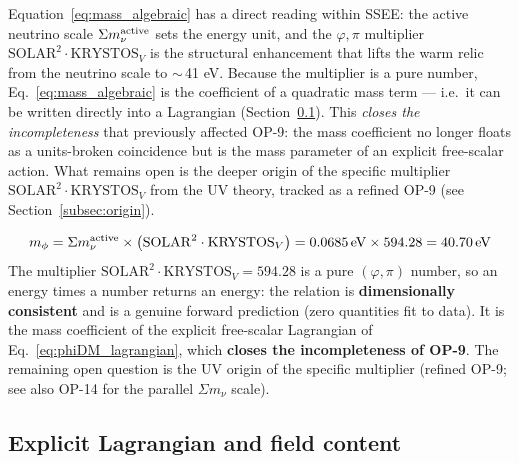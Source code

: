 \documentclass[12pt,a4paper]{article}
\newcommand{\SSEE}{\textsc{SSEE}}
\newcommand{\mphi}{m_\phi}
\newcommand{\mnu}{\Sigma m_\nu}
\begin{document}
Equation~\eqref{eq:mass_algebraic} has a direct reading within \SSEE: the active
neutrino scale $\mnu^{\rm active}$ sets the energy unit, and the $\varphi,\pi$
multiplier $\mathrm{SOLAR}^2\cdot\mathrm{KRYSTOS}_V$ is the structural enhancement
that lifts the warm relic from the neutrino scale to $\sim$\,41 eV. Because the
multiplier is a pure number, Eq.~\eqref{eq:mass_algebraic} is the coefficient of
a quadratic mass term --- i.e.\ it can be written directly into a Lagrangian
(Section~\ref{subsec:lagrangian}). This \emph{closes the incompleteness} that
previously affected OP-9: the mass coefficient no longer floats as a units-broken
coincidence but is the mass parameter of an explicit free-scalar action. What
remains open is the deeper origin of the specific multiplier
$\mathrm{SOLAR}^2\cdot\mathrm{KRYSTOS}_V$ from the UV theory, tracked as a refined
OP-9 (see Section~\ref{subsec:origin}).

\begin{tcolorbox}[result, title={Mass forward prediction --- dimensionally consistent}]
  \begin{equation*}
    \mphi = \mnu^{\rm active} \times
            \bigl(\mathrm{SOLAR}^2\cdot\mathrm{KRYSTOS}_V\bigr)
          = 0.0685\,\mathrm{eV} \times 594.28
          = 40.70\,\mathrm{eV}
  \end{equation*}
  The multiplier $\mathrm{SOLAR}^2\cdot\mathrm{KRYSTOS}_V=594.28$ is a pure
  $(\varphi,\pi)$ number, so an energy times a number returns an energy: the
  relation is \textbf{dimensionally consistent} and is a genuine forward
  prediction (zero quantities fit to data). It is the mass coefficient of the
  explicit free-scalar Lagrangian of Eq.~\eqref{eq:phiDM_lagrangian}, which
  \textbf{closes the incompleteness of OP-9}. The remaining open question is the
  UV origin of the specific multiplier (refined OP-9; see also OP-14 for the
  parallel $\Sigma m_\nu$ scale).
\end{tcolorbox}

\subsection{Explicit Lagrangian and field content}
\label{subsec:lagrangian}
\end{document}
